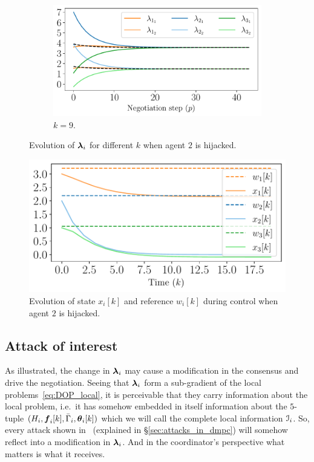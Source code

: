\documentclass[../main.tex]{subfiles}
\begin{document}
\begin{figure}[h]
\begin{subfigure}{0.45\textwidth}
  \end{subfigure}
  \begin{subfigure}{0.45\textwidth}
    \includegraphics[width=\textwidth]{../img/example_primal_decomposition/example_liar_lambda_k_9.pdf}
    \caption{$k=9$.}\label{fig:example_liar_lambda10}
  \end{subfigure}
  \caption{Evolution of $\boldsymbol{\lambda}_i$ for different $k$ when agent $2$ is hijacked.}\label{fig:example_liar_lambdas}
\end{figure}

\begin{figure}[h]
  \centering
  \includegraphics[width=.5\textwidth]{../img/example_primal_decomposition/example_liar_state.pdf}
  \caption{Evolution of state $x_{i}[k]$ and reference $w_{i}[k]$ during control when agent $2$ is hijacked.}\label{fig:example_liar_state}
\end{figure}


\subsection{Attack of interest}\label{sec:attack-interest}

As illustrated, the change in $\boldsymbol{\lambda}_i$ may cause a modification in the consensus and drive the negotiation.
Seeing that $\boldsymbol{\lambda}_i$ form a sub-gradient of the local problems~\eqref{eq:DOP_local}, it is perceivable that they carry information about the local problem, i.e.\ it has somehow embedded in itself information about the $5$-tuple $(H_{i},\vec{f}_{i}[k],\bar{\Gamma}_{i},\thetaik)$ which we will call the complete local information $\mathcal{I}_{i}$.
So, every attack shown in~\cite{VelardeEtAl2018} (explained in \S\ref{sec:attacks_in_dmpc}) will somehow reflect into a modification in $\boldsymbol{\lambda}_i$.
And in the coordinator's perspective what matters is what it receives.
\end{document}
